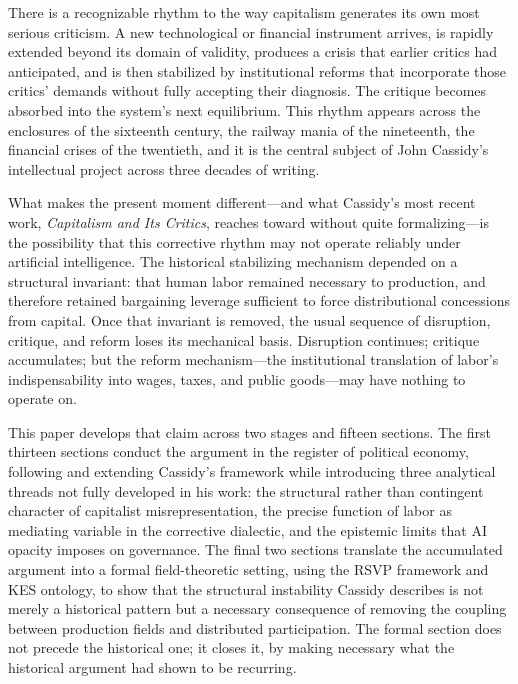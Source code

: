 \documentclass[11pt, a4paper]{article}
\theoremstyle{plain}
\theoremstyle{definition}
\begin{document}
There is a recognizable rhythm to the way capitalism generates its own most
serious criticism. A new technological or financial instrument arrives, is
rapidly extended beyond its domain of validity, produces a crisis that earlier
critics had anticipated, and is then stabilized by institutional reforms that
incorporate those critics' demands without fully accepting their diagnosis.
The critique becomes absorbed into the system's next equilibrium. This rhythm
appears across the enclosures of the sixteenth century, the railway mania of
the nineteenth, the financial crises of the twentieth, and it is the central
subject of John Cassidy's intellectual project across three decades of writing.

What makes the present moment different---and what Cassidy's most recent
work, \emph{Capitalism and Its Critics}, reaches toward without quite
formalizing---is the possibility that this corrective rhythm may not operate
reliably under artificial intelligence. The historical stabilizing mechanism
depended on a structural invariant: that human labor remained necessary to
production, and therefore retained bargaining leverage sufficient to force
distributional concessions from capital. Once that invariant is removed, the
usual sequence of disruption, critique, and reform loses its mechanical basis.
Disruption continues; critique accumulates; but the reform mechanism---the
institutional translation of labor's indispensability into wages, taxes, and
public goods---may have nothing to operate on.

This paper develops that claim across two stages and fifteen sections. The
first thirteen sections conduct the argument in the register of political
economy, following and extending Cassidy's framework while introducing three
analytical threads not fully developed in his work: the structural rather than
contingent character of capitalist misrepresentation, the precise function of
labor as mediating variable in the corrective dialectic, and the epistemic
limits that AI opacity imposes on governance. The final two sections translate
the accumulated argument into a formal field-theoretic setting, using the RSVP
framework and KES ontology, to show that the structural instability Cassidy
describes is not merely a historical pattern but a necessary consequence of
removing the coupling between production fields and distributed participation.
The formal section does not precede the historical one; it closes it, by making
necessary what the historical argument had shown to be recurring.
\end{document}
